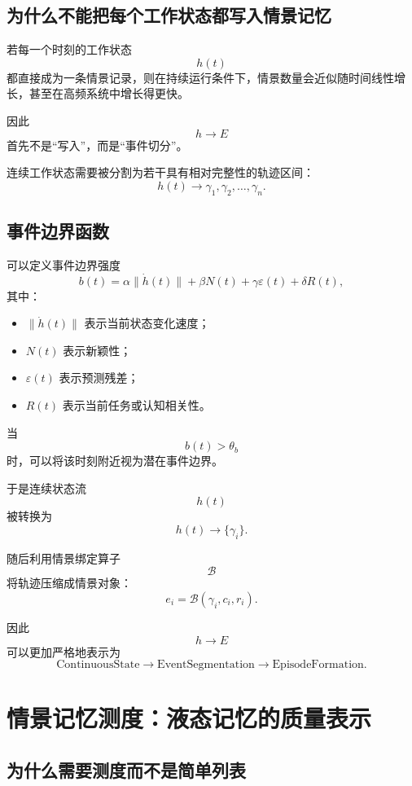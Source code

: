 \subsection{为什么不能把每个工作状态都写入情景记忆}

若每一个时刻的工作状态
\[
h(t)
\]
都直接成为一条情景记录，则在持续运行条件下，情景数量会近似随时间线性增长，甚至在高频系统中增长得更快。

因此
\[
h\rightarrow E
\]
首先不是“写入”，而是“事件切分”。

连续工作状态需要被分割为若干具有相对完整性的轨迹区间：
\[
h(t)
\longrightarrow
\gamma_1,\gamma_2,\ldots,\gamma_n.
\]

\subsection{事件边界函数}

可以定义事件边界强度
\[
b(t)
=
\alpha
\|\dot h(t)\|
+
\beta N(t)
+
\gamma \varepsilon(t)
+
\delta R(t),
\]
其中：

\begin{itemize}
    \item $\|\dot h(t)\|$ 表示当前状态变化速度；
    \item $N(t)$ 表示新颖性；
    \item $\varepsilon(t)$ 表示预测残差；
    \item $R(t)$ 表示当前任务或认知相关性。
\end{itemize}

当
\[
b(t)>\theta_b
\]
时，可以将该时刻附近视为潜在事件边界。

于是连续状态流
\[
h(t)
\]
被转换为
\[
\boxed{
h(t)
\rightarrow
\{\gamma_i\}.
}
\]

随后利用情景绑定算子
\[
\mathcal{B}
\]
将轨迹压缩成情景对象：
\[
\boxed{
e_i
=
\mathcal{B}(\gamma_i,c_i,r_i).
}
\]

因此
\[
h\rightarrow E
\]
可以更加严格地表示为
\[
\boxed{
\mathrm{ContinuousState}
\rightarrow
\mathrm{EventSegmentation}
\rightarrow
\mathrm{EpisodeFormation}.
}
\]

\section{情景记忆测度：液态记忆的质量表示}

\subsection{为什么需要测度而不是简单列表}

